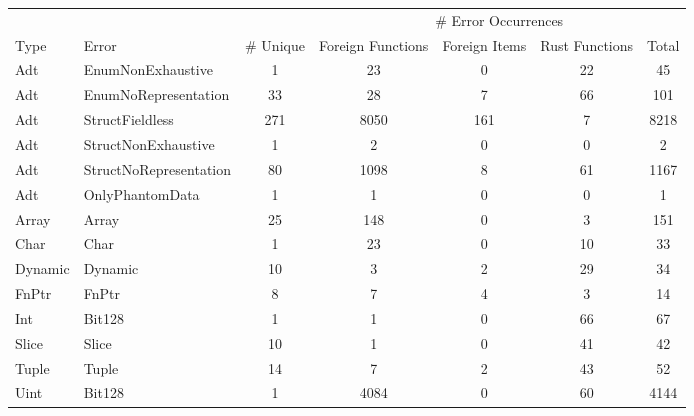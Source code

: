 \begin{table}[ht]
\centering
\begin{tabular}{llccccc}
  \hline
  & & & \multicolumn{4}{c}{# Error Occurrences} \\
 Type & Error & # Unique & Foreign Functions & Foreign Items & Rust Functions & Total \\
 \hline
Adt & EnumNonExhaustive & 1 & 23 & 0 & 22 & 45 \\ 
  Adt & EnumNoRepresentation & 33 & 28 & 7 & 66 & 101 \\ 
  Adt & StructFieldless & 271 & 8050 & 161 & 7 & 8218 \\ 
  Adt & StructNonExhaustive & 1 & 2 & 0 & 0 & 2 \\ 
  Adt & StructNoRepresentation & 80 & 1098 & 8 & 61 & 1167 \\ 
  Adt & OnlyPhantomData & 1 & 1 & 0 & 0 & 1 \\ 
  Array & Array & 25 & 148 & 0 & 3 & 151 \\ 
  Char & Char & 1 & 23 & 0 & 10 & 33 \\ 
  Dynamic & Dynamic & 10 & 3 & 2 & 29 & 34 \\ 
  FnPtr & FnPtr & 8 & 7 & 4 & 3 & 14 \\ 
  Int & Bit128 & 1 & 1 & 0 & 66 & 67 \\ 
  Slice & Slice & 10 & 1 & 0 & 41 & 42 \\ 
  Tuple & Tuple & 14 & 7 & 2 & 43 & 52 \\ 
  Uint & Bit128 & 1 & 4084 & 0 & 60 & 4144 \\ 
   \hline
\end{tabular}
\end{table}

